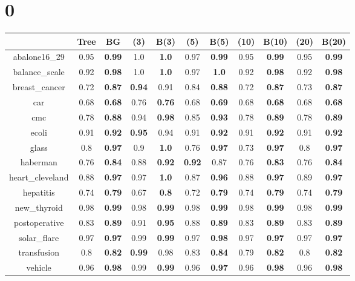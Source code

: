 \documentclass{article}%
\begin{document}
%
\normalsize%
\section*{0}%
\begin{tabular}{c|cccccccccc}%
\hline%
&Tree&BG&(3)&B(3)&(5)&B(5)&(10)&B(10)&(20)&B(20)\\%
\hline%
abalone16\_29&0.95&\textbf{0.99}&1.0&\textbf{1.0}&0.97&\textbf{0.99}&0.95&\textbf{0.99}&0.95&\textbf{0.99}\\%
\hline%
balance\_scale&0.92&\textbf{0.98}&1.0&\textbf{1.0}&0.97&\textbf{1.0}&0.92&\textbf{0.98}&0.92&\textbf{0.98}\\%
\hline%
breast\_cancer&0.72&\textbf{0.87}&\textbf{0.94}&0.91&0.84&\textbf{0.88}&0.72&\textbf{0.87}&0.73&\textbf{0.87}\\%
\hline%
car&0.68&\textbf{0.68}&0.76&\textbf{0.76}&0.68&\textbf{0.69}&0.68&\textbf{0.68}&0.68&\textbf{0.68}\\%
\hline%
cmc&0.78&\textbf{0.88}&0.94&\textbf{0.98}&0.85&\textbf{0.93}&0.78&\textbf{0.89}&0.78&\textbf{0.89}\\%
\hline%
ecoli&0.91&\textbf{0.92}&\textbf{0.95}&0.94&0.91&\textbf{0.92}&0.91&\textbf{0.92}&0.91&\textbf{0.92}\\%
\hline%
glass&0.8&\textbf{0.97}&0.9&\textbf{1.0}&0.76&\textbf{0.97}&0.73&\textbf{0.97}&0.8&\textbf{0.97}\\%
\hline%
haberman&0.76&\textbf{0.84}&0.88&\textbf{0.92}&\textbf{0.92}&0.87&0.76&\textbf{0.83}&0.76&\textbf{0.84}\\%
\hline%
heart\_cleveland&0.88&\textbf{0.97}&0.97&\textbf{1.0}&0.87&\textbf{0.96}&0.88&\textbf{0.97}&0.89&\textbf{0.97}\\%
\hline%
hepatitis&0.74&\textbf{0.79}&0.67&\textbf{0.8}&0.72&\textbf{0.79}&0.74&\textbf{0.79}&0.74&\textbf{0.79}\\%
\hline%
new\_thyroid&0.98&\textbf{0.99}&0.98&\textbf{0.99}&0.98&\textbf{0.99}&0.98&\textbf{0.99}&0.98&\textbf{0.99}\\%
\hline%
postoperative&0.83&\textbf{0.89}&0.91&\textbf{0.95}&0.88&\textbf{0.89}&0.83&\textbf{0.89}&0.83&\textbf{0.89}\\%
\hline%
solar\_flare&0.97&\textbf{0.97}&0.99&\textbf{0.99}&0.97&\textbf{0.98}&0.97&\textbf{0.97}&0.97&\textbf{0.97}\\%
\hline%
transfusion&0.8&\textbf{0.82}&\textbf{0.99}&0.98&0.83&\textbf{0.84}&0.79&\textbf{0.82}&0.8&\textbf{0.82}\\%
\hline%
vehicle&0.96&\textbf{0.98}&0.99&\textbf{0.99}&0.96&\textbf{0.97}&0.96&\textbf{0.98}&0.96&\textbf{0.98}\\%

\end{tabular}
\end{document}
